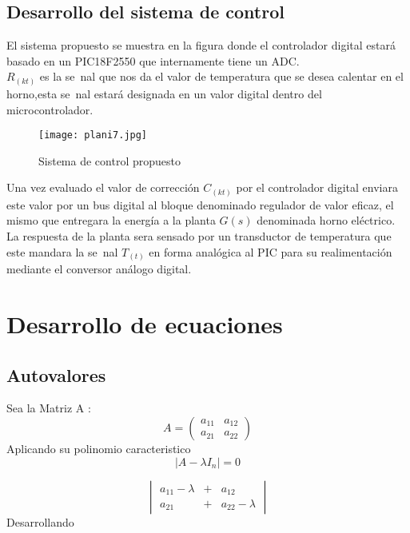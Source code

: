 \documentclass[Spanish,12pt,doublespace,german,letterpaper,dvipdfm]{article}
\begin{document}
\subsection{Desarrollo del sistema de control}
El sistema propuesto se muestra en la figura donde el controlador
digital estará
basado en un PIC18F2550 que internamente tiene un ADC.\\
$R_{(kt)}$ es la se~nal que nos da el valor de temperatura que se
desea calentar en el horno,esta se~nal estará designada en un
valor digital dentro del microcontrolador.\\

\begin{figure}[h!]
\begin{center}
 \texttt{[image: plani7.jpg]}
\end{center}
\caption{Sistema de control propuesto}
\end{figure}

Una vez evaluado el valor de correcci\'on $C_{(kt)}$ por el
controlador digital enviara este valor por un bus digital al
bloque denominado regulador de valor eficaz, el mismo que
entregara la energía a la
planta $G(s)$  denominada horno eléctrico.\\
La respuesta de la planta sera sensado por un transductor de
temperatura que este mandara la se~nal $T_{(t)}$ en forma
analógica al PIC para su realimentaci\'on mediante el conversor
análogo digital.


\section{Desarrollo de ecuaciones}
\subsection{Autovalores}
Sea la Matriz A : 
\begin{equation}
A=
\begin{pmatrix}
  a_{11}    & a_{12} \\
  a_{21}    & a_{22}       
\end{pmatrix}
\end{equation}
Aplicando su polinomio caracteristico 
$$|A -\lambda I_n|=0$$

\begin{equation}
\begin{vmatrix}
  a_{11}-\lambda    & + & a_{12}           \\
  a_{21}            & + & a_{22}-\lambda 
\end{vmatrix}
\end{equation}
Desarrollando
\end{document}
